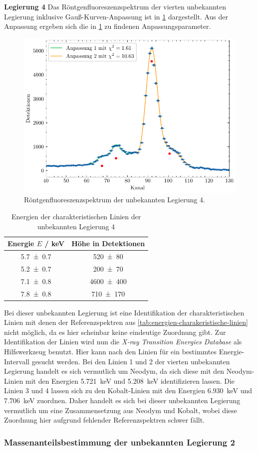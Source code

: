 \noindent\textbf{Legierung 4}\newline
Das Röntgenfluoreszenzspektrum der vierten unbekannten Legierung inklusive Gauß-Kurven-Anpassung ist in \cref{fig:unbekannt4} dargestellt. Aus der Anpassung ergeben sich die
in \cref{tab:unbekannt4} zu findenen Anpassungsparameter.
\begin{figure}[H]
	\centering
	\includegraphics[width=0.6\linewidth]{../figs/Unbekannt4.pdf}
	\caption{Röntgenfluoreszenzspektrum der unbekannten Legierung 4.}
	\label{fig:unbekannt4}
\end{figure}
\begin{table}[H]
    \centering
    \caption{Energien der charakteristischen Linien der unbekannten Legierung 4}
    \label{tab:unbekannt4}
    \begin{tabular}{c|c}
       Energie $E$ / \unit{\kilo\electronvolt} & Höhe in Detektionen \\
\hline
\num{5.7\pm 0.7} & \num{520\pm 80} \\ 
\num{5.2\pm 0.7} & \num{200\pm 70} \\ 
\num{7.1\pm 0.8} & \num{4600\pm 400} \\ 
\num{7.8\pm 0.8} & \num{710\pm 170} \\ 

    \end{tabular}
\end{table} Bei dieser unbekannten Legierung ist eine Identifikation der charakteristischen Linien mit denen der Referenzspektren aus \cref{tab:energien-charakeristische-linien}
nicht möglich, da es hier scheinbar keine eindeutige Zuordnung gibt. Zur Identifikation der Linien wird nun die \textit{X-ray Transition Energies Database} \cite{nist_xray_database}
als Hilfswerkzeug benutzt. Hier kann nach den Linien für ein bestimmtes Energie-Intervall gesucht werden. Bei den Linien 1 und 2 der vierten unbekannten Legierung
handelt es sich vermutlich um Neodym, da sich diese mit den Neodym-Linien mit den Energien \SI{5,721}{\kilo \electronvolt} und \SI{5,208}{\kilo \electronvolt}
identifizieren lassen. Die Linien 3 und 4 lassen sich zu den Kobalt-Linien mit den Energien \SI{6,930}{\kilo \electronvolt} und \SI{7,706}{\kilo \electronvolt}
zuordnen. Daher handelt es sich bei dieser unbekannten Legierung vermutlich um eine Zusammensetzung aus Neodym und Kobalt, wobei diese Zuordnung hier
aufgrund fehlender Referenzspektren schwer fällt.
\subsubsection*{Massenanteilsbestimmung der unbekannten Legierung 2}\label{subsubsec:massenanteile}